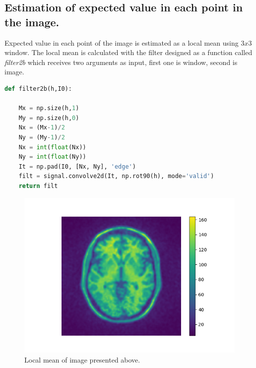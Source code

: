 \subsection*{Estimation of expected value in each point in the image.}
Expected value in each point of the image is estimated as a local mean using $3 x 3$ window. The local mean is calculated with the filter designed as a function called \textit{filter2b} which receives two arguments as input, first one is window, second is image.
\begin{lstlisting}[language=Python, caption = Filtering function.]
def filter2b(h,I0):

	Mx = np.size(h,1)
	My = np.size(h,0)
	Nx = (Mx-1)/2
	Ny = (My-1)/2
	Nx = int(float(Nx))
	Ny = int(float(Ny))
	It = np.pad(I0, [Nx, Ny], 'edge')
	filt = signal.convolve2d(It, np.rot90(h), mode='valid')
	return filt
\end{lstlisting}
\begin{figure}[H]
	\centering{}
		\includegraphics[scale=0.7]{figures/module03/70_local_mean}
	\caption{Local mean of image presented above.} 
\end{figure}
